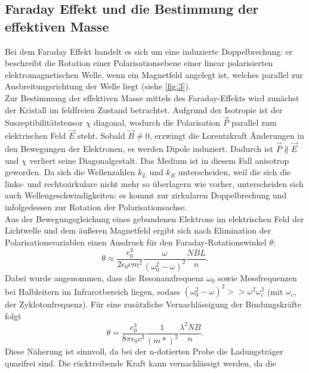 \subsection{Faraday Effekt und die Bestimmung der effektiven Masse}
Bei dem Faraday Effekt handelt es sich um eine induzierte Doppelbrechung: er
beschreibt die Rotation einer Polarisationsebene einer linear polarisierten 
elektromagnetischen Welle, wenn ein Magnetfeld angelegt ist, welches parallel
zur Ausbreitungsrichtung der Welle liegt (siehe \autoref{fig:3}).
\vspace{0.5em}
\\
Zur Bestimmung der effektiven Masse mittels des Faraday-Effekts wird zunächst
der Kristall im feldfreien Zustand betrachtet. Aufgrund der Isotropie ist der
Suszeptibilitätstensor $\chi$ diagonal, wodurch die Polarisation $\vec{P}$ 
parallel zum elektrischen Feld $\vec{E}$ steht. Sobald $\vec{B} \neq 0$, erzwingt 
die Lorentzkraft Änderungen in den Bewegungen der Elektronen, es werden Dipole
induziert. Dadurch ist $\vec{P} \nparallel \vec{E}$ und $\chi$ verliert seine 
Diagonalgestalt. Das Medium ist in diesem Fall anisotrop geworden. Da sich die 
Wellenzahlen $k_L$ und $k_R$ unterscheiden, weil die sich die links- und 
rechtszirkulare nicht mehr so überlagern wie vorher, unterscheiden sich auch 
Wellengeschwindigkeiten: es kommt zur zirkularen Doppelbrechung und infolgedessen 
zur Rotation der Polarisationsachse.
\\
Aus der Bewegungsgleichung eines gebundenen Elektrons im elektrischen Feld der
Lichtwelle und dem äußeren Magnetfeld ergibt sich nach Elimination der
Polarisationsvariablen einen Ausdruck für den Faraday-Rotationswinkel $\theta$:
\begin{equation}
    \label{eqn:1}
    \theta \approx \frac{e_0^3}{2 \epsilon_0 c m^2} \frac{\omega}{(\omega_0^2 -
     \omega)^2} \frac{N B L}{n}.
\end{equation}
Dabei wurde angenommen, dass die Resonanzfrequenz $\omega_0$ sowie Messfrequenzen 
bei Halbleitern im Infrarotbereich liegen, sodass $(\omega_0^2 -\omega)^2 >> \omega^2 \omega_c^2$
(mit $\omega_c$, der Zyklotonfrequenz). Für eine zusätzliche Vernachlässigung der 
Bindungskräfte folgt
\begin{equation}
    \label{eqn:2}
    \theta = \frac{e_0^3}{8 \pi \epsilon_0 c^3} \frac{1}{(m*)^2} \frac{\lambda^2 N B}{n}.
\end{equation}
Diese Näherung ist sinnvoll, da bei der n-dotierten Probe die Ladungsträger 
quasifrei sind. Die rücktreibende Kraft kann vernachlässigt werden, da die 
